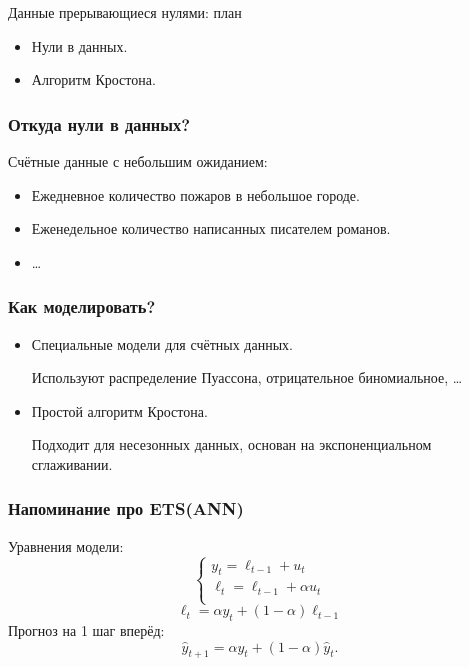 
\begin{frame} %


\end{frame}



\begin{frame}{Данные прерывающиеся нулями: план}
  \begin{itemize}[<+->]
    \item Нули в данных.
    \item Алгоритм Кростона. 
  \end{itemize}

\end{frame}

\begin{frame}
  \frametitle{Откуда нули в данных?}

  Счётные данные с \alert{небольшим} ожиданием: 
  \begin{itemize}[<+->]
    \item Ежедневное количество пожаров в небольшое городе.
    \item Еженедельное количество написанных писателем романов. 
    \item \ldots
  \end{itemize}
  
\end{frame}

\begin{frame}
  \frametitle{Как моделировать?}

  \begin{itemize}[<+->]
    \item Специальные модели для счётных данных. 
    
    Используют распределение \alert{Пуассона}, \alert{отрицательное биномиальное}, \ldots

    \item Простой алгоритм Кростона. 
    
    Подходит для \alert{несезонных} данных, основан на \alert{экспоненциальном сглаживании}. 
  \end{itemize}

  

\end{frame}


\begin{frame}
  \frametitle{Напоминание про ETS(ANN)}

  Уравнения модели:
  \[
  \begin{cases}
  y_t = \ell_{t-1} + u_t  \\
  \ell_t = \ell_{t-1} + \alpha u_t \\
  \end{cases}
  \]
  \pause
  \[
  \ell_t = \alpha y_t + (1 - \alpha) \ell_{t-1}
  \]
  \pause 
  Прогноз на 1 шаг вперёд:
  \[
  \hat y_{t+1} = \alpha y_t + (1-\alpha )\hat y_{t}.
  \]
\end{frame}


